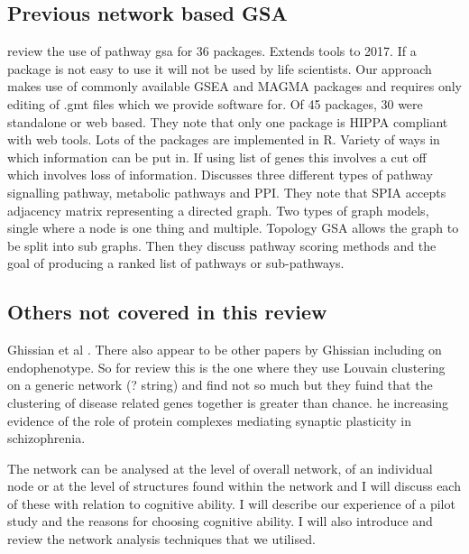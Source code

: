 \subsection{Previous network based GSA}

\cite{nguyen2018network}    review the use of pathway gsa for 36 packages.
Extends tools to 2017. If a package is not easy to use it will not be used by life scientists. Our approach makes use of commonly available GSEA and MAGMA packages and requires only editing of .gmt files which we provide software for. Of 45 packages, 30 were standalone or web based. They note that only one package is HIPPA compliant with web tools. Lots of the packages are implemented in R. Variety of ways in which information can be put in. If using list of genes this involves a cut off which involves loss of information. Discusses three different types of pathway signalling pathway, metabolic pathways and PPI. They note that SPIA accepts adjacency matrix representing a directed graph. Two types of graph models, single where a node is one thing and multiple. Topology GSA allows the graph to be split into sub graphs.
Then they discuss pathway scoring methods and the goal of producing a ranked list of pathways or sub-pathways.


\subsection{Others not covered in this review}
Ghissian et al \cite{ghiassian2015disease}. There also appear to be other papers by Ghissian including on endophenotype. So for review this is the one where they use Louvain clustering on a generic network (? string) and find not \cite{blondel2008fast}so much but they fuind that the clustering of disease related genes together is greater than chance. he increasing evidence of the role of protein complexes mediating synaptic plasticity in schizophrenia.

The network can be analysed at the level of overall network, of an individual node or at the level of structures found within the network and I will discuss each of these with relation to cognitive ability. I will describe our experience of a pilot study and the reasons for choosing cognitive ability. I will also introduce and review the network analysis techniques that we utilised. 
 






